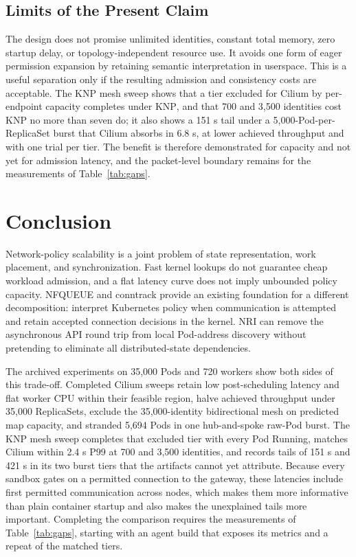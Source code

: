 \documentclass[letterpaper,twocolumn,10pt]{article}
\newcommand{\sys}{\textsc{KNP}}
\begin{document}
\subsection{Limits of the Present Claim}
The design does not promise unlimited identities, constant total
memory, zero startup delay, or topology-independent resource use.
It avoids one form of eager permission expansion by retaining
semantic interpretation in userspace. This is a useful separation
only if the resulting admission and consistency costs are acceptable.
The \sys{} mesh sweep shows that a tier excluded for Cilium by
per-endpoint capacity completes under \sys{}, and that 700 and 3,500
identities cost \sys{} no more than seven do; it also shows a 151 s tail
under a 5,000-Pod-per-ReplicaSet burst that Cilium absorbs in 6.8 s, at
lower achieved throughput and with one trial per tier. The benefit is
therefore demonstrated for capacity and not yet for admission latency,
and the packet-level boundary remains for the measurements of
Table~\ref{tab:gaps}.

\section{Conclusion}
Network-policy scalability is a joint problem of state representation,
work placement, and synchronization. Fast kernel lookups do not
guarantee cheap workload admission, and a flat latency curve does
not imply unbounded policy capacity. NFQUEUE and conntrack provide
an existing foundation for a different decomposition: interpret
Kubernetes policy when communication is attempted and retain accepted
connection decisions in the kernel. NRI can remove the asynchronous
API round trip from local Pod-address discovery without pretending
to eliminate all distributed-state dependencies.

The archived experiments on 35,000 Pods and 720 workers show both
sides of this trade-off. Completed Cilium sweeps retain low
post-scheduling latency and flat worker CPU within their feasible
region, halve achieved throughput under 35,000 ReplicaSets, exclude the
35,000-identity bidirectional mesh on predicted map capacity, and
stranded 5,694 Pods in one hub-and-spoke raw-Pod burst. The \sys{}
mesh sweep completes that excluded tier with every Pod Running, matches
Cilium within 2.4 s P99 at 700 and 3,500 identities, and records tails
of 151 s and 421 s in its two burst tiers that the artifacts cannot yet
attribute. Because every sandbox gates on a permitted connection to the
gateway, these latencies include first permitted communication across
nodes, which makes them more informative than plain container startup
and also makes the unexplained tails more important. Completing the
comparison requires the measurements of Table~\ref{tab:gaps}, starting
with an agent build that exposes its metrics and a repeat of the
matched tiers.
\end{document}
